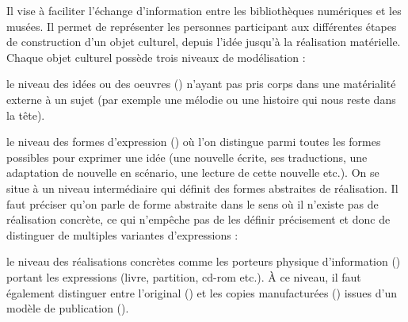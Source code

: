 Il vise à faciliter l’échange d’information entre les bibliothèques numériques et les musées. 
Il permet de représenter les personnes participant aux différentes étapes de construction d’un objet culturel, depuis l’idée jusqu’à la réalisation matérielle.
Chaque objet culturel possède trois niveaux de modélisation :
\begin{liste}
	\item le niveau des idées ou des oeuvres () n’ayant pas pris corps dans une matérialité externe à un sujet (par exemple une mélodie ou une histoire qui nous reste dans la tête). 

	\item le niveau des formes d'expression () où l'on distingue parmi toutes les formes possibles pour exprimer une idée (une nouvelle écrite, ses traductions, une adaptation de nouvelle en scénario, une lecture de cette nouvelle etc.).
	On se situe à un niveau intermédiaire qui définit des formes abstraites de  réalisation.
	Il faut préciser qu'on parle de forme abstraite dans le sens où il n'existe pas de réalisation concrète, ce qui n'empêche pas de les définir précisement et donc de distinguer de multiples variantes d'expressions :

	
	\item le niveau des réalisations concrètes comme les porteurs physique d’information () portant les expressions (livre, partition, cd-rom etc.). 
	À ce niveau, il faut également distinguer entre l’original () et les copies manufacturées () issues d’un modèle de publication (). %
\end{liste}





